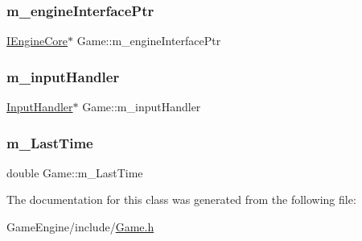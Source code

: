 \subsubsection{\texorpdfstring{m\+\_\+engine\+Interface\+Ptr}{m\_engineInterfacePtr}}
{\footnotesize\ttfamily \mbox{\hyperlink{class_i_engine_core}{I\+Engine\+Core}}$\ast$ Game\+::m\+\_\+engine\+Interface\+Ptr}

\mbox{\label{class_game_a001f55f492c3fbafe8cf27eb04df293c}} 
\subsubsection{\texorpdfstring{m\+\_\+input\+Handler}{m\_inputHandler}}
{\footnotesize\ttfamily \mbox{\hyperlink{struct_input_handler}{Input\+Handler}}$\ast$ Game\+::m\+\_\+input\+Handler}

\mbox{\label{class_game_a6b2f92aca705413c653acde07745a97e}} 
\subsubsection{\texorpdfstring{m\+\_\+\+Last\+Time}{m\_LastTime}}
{\footnotesize\ttfamily double Game\+::m\+\_\+\+Last\+Time}



The documentation for this class was generated from the following file\+:\begin{DoxyCompactItemize}
\item 
Game\+Engine/include/\mbox{\hyperlink{_game_8h}{Game.\+h}}\end{DoxyCompactItemize}
